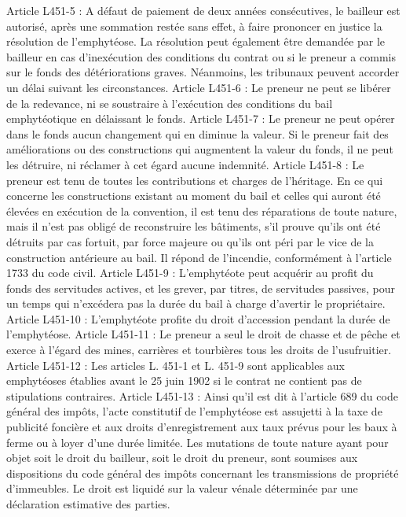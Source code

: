 \documentclass[11pt,a4paper]{report}
\begin{document}
	Article L451-5 : A défaut de paiement de deux années consécutives, le bailleur est autorisé, après une sommation restée
	sans effet, à faire prononcer en justice la résolution de l'emphytéose.
	La résolution peut également être demandée par le bailleur en cas d'inexécution des conditions du contrat ou si le
	preneur a commis sur le fonds des détériorations graves.
	Néanmoins, les tribunaux peuvent accorder un délai suivant les circonstances.
	Article L451-6 : Le preneur ne peut se libérer de la redevance, ni se soustraire à l'exécution des conditions du bail
	emphytéotique en délaissant le fonds.
	Article L451-7 : Le preneur ne peut opérer dans le fonds aucun changement qui en diminue la valeur.
	Si le preneur fait des améliorations ou des constructions qui augmentent la valeur du fonds, il ne peut les détruire, ni
	réclamer à cet égard aucune indemnité.
	Article L451-8 : Le preneur est tenu de toutes les contributions et charges de l'héritage.
	En ce qui concerne les constructions existant au moment du bail et celles qui auront été élevées en exécution de la
	convention, il est tenu des réparations de toute nature, mais il n'est pas obligé de reconstruire les bâtiments, s'il prouve
	qu'ils ont été détruits par cas fortuit, par force majeure ou qu'ils ont péri par le vice de la construction antérieure au bail.
	Il répond de l'incendie, conformément à l'article 1733 du code civil.
	Article L451-9 : L'emphytéote peut acquérir au profit du fonds des servitudes actives, et les grever, par titres, de
	servitudes passives, pour un temps qui n'excédera pas la durée du bail à charge d'avertir le propriétaire.
	Article L451-10 : L'emphytéote profite du droit d'accession pendant la durée de l'emphytéose.
	Article L451-11 : Le preneur a seul le droit de chasse et de pêche et exerce à l'égard des mines, carrières et tourbières
	tous les droits de l'usufruitier.
	Article L451-12 : Les articles L. 451-1 et L. 451-9 sont applicables aux emphytéoses établies avant le 25 juin 1902 si le
	contrat ne contient pas de stipulations contraires.
	Article L451-13 : Ainsi qu'il est dit à l'article 689 du code général des impôts, l'acte constitutif de l'emphytéose est assujetti
	à la taxe de publicité foncière et aux droits d'enregistrement aux taux prévus pour les baux à ferme ou à loyer d'une
	durée limitée.
	Les mutations de toute nature ayant pour objet soit le droit du bailleur, soit le droit du preneur, sont soumises aux
	dispositions du code général des impôts concernant les transmissions de propriété d'immeubles. Le droit est liquidé sur
	la valeur vénale déterminée par une déclaration estimative des parties.
\end{document}
